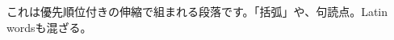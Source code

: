 \documentclass{article}
\begin{document}
\begin{ptjparagraph}
これは優先順位付きの伸縮で組まれる段落です。「括弧」や、句読点。Latin wordsも混ざる。
\end{ptjparagraph}
\end{document}
